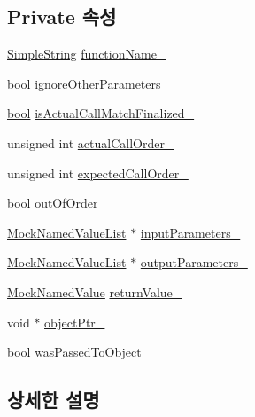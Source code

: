 \subsection*{Private 속성}
\begin{DoxyCompactItemize}
\item 
\hyperlink{class_simple_string}{Simple\+String} \hyperlink{class_mock_checked_expected_call_ac33176f3607073fb4b51a445d8912ba7}{function\+Name\+\_\+}
\item 
\hyperlink{avb__gptp_8h_af6a258d8f3ee5206d682d799316314b1}{bool} \hyperlink{class_mock_checked_expected_call_a571e531f9eee13eb202b58dc0276961d}{ignore\+Other\+Parameters\+\_\+}
\item 
\hyperlink{avb__gptp_8h_af6a258d8f3ee5206d682d799316314b1}{bool} \hyperlink{class_mock_checked_expected_call_ac0e1e4489285d1321956007eb75b85a2}{is\+Actual\+Call\+Match\+Finalized\+\_\+}
\item 
unsigned int \hyperlink{class_mock_checked_expected_call_a58e873078e053e6b06ad68a8a7e0c313}{actual\+Call\+Order\+\_\+}
\item 
unsigned int \hyperlink{class_mock_checked_expected_call_afa5b7a7d70e8552f039255ae1d85f215}{expected\+Call\+Order\+\_\+}
\item 
\hyperlink{avb__gptp_8h_af6a258d8f3ee5206d682d799316314b1}{bool} \hyperlink{class_mock_checked_expected_call_ae029f516e1d03929c5afbf3110a05216}{out\+Of\+Order\+\_\+}
\item 
\hyperlink{class_mock_named_value_list}{Mock\+Named\+Value\+List} $\ast$ \hyperlink{class_mock_checked_expected_call_a13ed0d812f00d134559b7436cdfb63f5}{input\+Parameters\+\_\+}
\item 
\hyperlink{class_mock_named_value_list}{Mock\+Named\+Value\+List} $\ast$ \hyperlink{class_mock_checked_expected_call_ac7fbe8f1a1ddf5d4a0f657d735e928d5}{output\+Parameters\+\_\+}
\item 
\hyperlink{class_mock_named_value}{Mock\+Named\+Value} \hyperlink{class_mock_checked_expected_call_a9e7e87d4d9d52c669920f0262416df83}{return\+Value\+\_\+}
\item 
void $\ast$ \hyperlink{class_mock_checked_expected_call_aaa34e20272636b954a7c4f8538e3a03a}{object\+Ptr\+\_\+}
\item 
\hyperlink{avb__gptp_8h_af6a258d8f3ee5206d682d799316314b1}{bool} \hyperlink{class_mock_checked_expected_call_acf314d631f3d1c061a194a72dba26ea1}{was\+Passed\+To\+Object\+\_\+}
\end{DoxyCompactItemize}


\subsection{상세한 설명}


